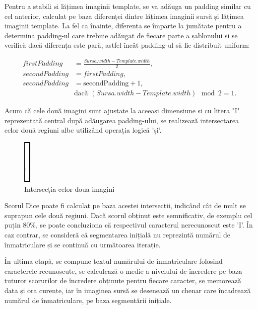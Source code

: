 \documentclass[a4paper,12pt]{report}
\begin{document}
Pentru a stabili si lățimea imaginii template, se va adăuga un padding similar cu cel anterior, calculat pe baza diferenței dintre lățimea imaginii sursă și lățimea imaginii template. La fel ca înainte, diferența se împarte la jumătate pentru a determina padding-ul care trebuie adăugat de fiecare parte a șablonului si se verifică dacă diferența este pară, astfel încât padding-ul să fie distribuit uniform:

\[
    \begin{aligned}
        firstPadding  & = \frac{Sursa.width - Template.width}{2},               \\
        secondPadding & = firstPadding,                                         \\
        secondPadding & = \text{secondPadding} + 1,                             \\
                      & \text{dacă } (Sursa.width - Template.width) \mod 2 = 1.
    \end{aligned}
\]

Acum că cele două imagini sunt ajustate la aceeași dimensiune si cu litera "I" reprezentată central după adăugarea padding-ului, se realizează intersectarea celor două regiuni albe utilizând operația logică 'și'.

\begin{figure}[h]
    \centering
    \includegraphics[height=0.2\textwidth]{images/intersection.jpg}
    \caption{Intersecția celor doua imagini}
\end{figure}
\FloatBarrier

Scorul Dice poate fi calculat pe baza acestei intersecții, indicând cât de mult se suprapun cele două regiuni. Dacă scorul obținut este semnificativ, de exemplu cel puțin 80\%, se poate concluziona că respectivul caracterul nerecunoscut este 'I'. În caz contrar, se consideră că segmentarea inițială nu reprezintă numărul de înmatriculare și se continuă cu următoarea iterație.

În ultima etapă, se compune textul numărului de înmatriculare folosind caracterele recunoscute, se calculează o medie a nivelului de încredere pe baza tuturor scorurilor de încredere obținute pentru fiecare caracter, se memorează data și ora curente, iar în imaginea sursă se desenează un chenar care încadrează numărul de înmatriculare, pe baza segmentării inițiale.
\end{document}

